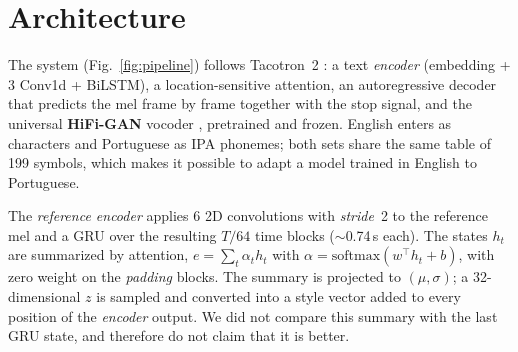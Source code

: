 \documentclass[twocolumn,a4paper,10pt]{article}
\begin{document}
\section{Architecture}
The system (Fig.~\ref{fig:pipeline}) follows Tacotron~2 \cite{shen,nvidiataco}: a text \textit{encoder} (embedding + 3 Conv1d + BiLSTM), a location-sensitive attention, an autoregressive decoder that predicts the mel frame by frame together with the stop signal, and the universal \textbf{HiFi-GAN} vocoder \cite{hifigan}, pretrained and frozen. English enters as characters and Portuguese as IPA phonemes; both sets share the same table of 199 symbols, which makes it possible to adapt a model trained in English to Portuguese.

The \textit{reference encoder} \cite{skerry} applies 6 2D convolutions with \textit{stride}~2 to the reference mel and a GRU over the resulting $T/64$ time blocks ($\sim$0.74\,s each). The states $h_t$ are summarized by attention, $e=\sum_t \alpha_t h_t$ with $\alpha=\mathrm{softmax}(w^\top h_t+b)$, with zero weight on the \textit{padding} blocks. The summary is projected to $(\mu,\sigma)$; a 32-dimensional $z$ is sampled and converted into a style vector added to every position of the \textit{encoder} output. We did not compare this summary with the last GRU state, and therefore do not claim that it is better.
\end{document}
